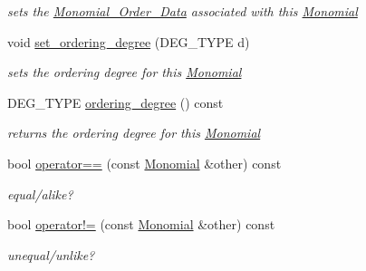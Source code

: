 \begin{Indent}
\begin{DoxyCompactItemize}
\begin{DoxyCompactList}\small\item\em sets the \hyperlink{group__orderinggroup_class_monomial___order___data}{Monomial\+\_\+\+Order\+\_\+\+Data} associated with this \hyperlink{group__polygroup_class_monomial}{Monomial} \end{DoxyCompactList}\item 
\mbox{\label{group__polygroup_a6d0118da218d7c7d70c11c1426d72d48}} 
void \hyperlink{group__polygroup_a6d0118da218d7c7d70c11c1426d72d48}{set\+\_\+ordering\+\_\+degree} (D\+E\+G\+\_\+\+T\+Y\+PE d)
\begin{DoxyCompactList}\small\item\em sets the ordering degree for this \hyperlink{group__polygroup_class_monomial}{Monomial} \end{DoxyCompactList}\item 
\mbox{\label{group__polygroup_aee8d68e55ce2f37c01b0243f87971fb6}} 
D\+E\+G\+\_\+\+T\+Y\+PE \hyperlink{group__polygroup_aee8d68e55ce2f37c01b0243f87971fb6}{ordering\+\_\+degree} () const
\begin{DoxyCompactList}\small\item\em returns the ordering degree for this \hyperlink{group__polygroup_class_monomial}{Monomial} \end{DoxyCompactList}\item 
\mbox{\label{group__polygroup_a063e7166a4bf8abc8748f8758cc31d73}} 
bool \hyperlink{group__polygroup_a063e7166a4bf8abc8748f8758cc31d73}{operator==} (const \hyperlink{group__polygroup_class_monomial}{Monomial} \&other) const
\begin{DoxyCompactList}\small\item\em equal/alike? \end{DoxyCompactList}\item 
\mbox{\label{group__polygroup_a0fb6394c2de8d206d119783707618db7}} 
bool \hyperlink{group__polygroup_a0fb6394c2de8d206d119783707618db7}{operator!=} (const \hyperlink{group__polygroup_class_monomial}{Monomial} \&other) const
\begin{DoxyCompactList}\small\item\em unequal/unlike? \end{DoxyCompactList}\item 

\end{DoxyCompactItemize}
\end{Indent}
